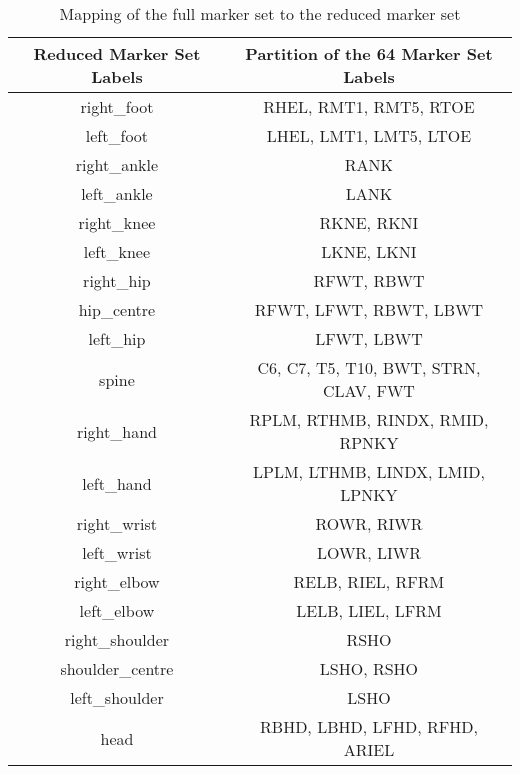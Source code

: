 \begin{table}[H]
    \centering
    \begin{tabular}{|c|c|}
        \hline
        \textbf{Reduced Marker Set Labels} & \textbf{Partition of the 64 Marker Set Labels} \\
        \hline
        right\_foot & RHEL, RMT1, RMT5, RTOE \\
        left\_foot & LHEL, LMT1, LMT5, LTOE \\
        right\_ankle & RANK \\
        left\_ankle & LANK \\
        right\_knee & RKNE, RKNI \\
        left\_knee & LKNE, LKNI \\
        right\_hip & RFWT, RBWT \\
        hip\_centre & RFWT, LFWT, RBWT, LBWT \\
        left\_hip & LFWT, LBWT \\
        spine & C6, C7, T5, T10, BWT, STRN, CLAV, FWT \\
        right\_hand & RPLM, RTHMB, RINDX, RMID, RPNKY\\
        left\_hand & LPLM, LTHMB, LINDX, LMID, LPNKY \\
        right\_wrist & ROWR, RIWR \\
        left\_wrist & LOWR, LIWR \\
        right\_elbow & RELB, RIEL, RFRM\\
        left\_elbow & LELB, LIEL, LFRM \\
        right\_shoulder & RSHO \\
        shoulder\_centre & LSHO, RSHO \\
        left\_shoulder & LSHO \\
        head & RBHD, LBHD, LFHD, RFHD, ARIEL \\
        \hline
    \end{tabular}
    \caption{Mapping of the full marker set to the reduced marker set}
    \label{tab:marker_mapping_64}
\end{table}
